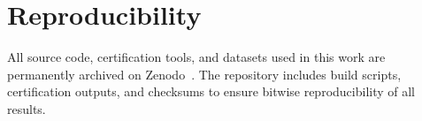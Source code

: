 \documentclass[11pt]{article}
\theoremstyle{inline}
\theoremstyle{break}
\theoremstyle{break}
\theoremstyle{break}
\theoremstyle{break}
\theoremstyle{break}
\theoremstyle{break}
\theoremstyle{break}
\theoremstyle{inline}
\begin{document}
\section{Reproducibility}

All source code, certification tools, and datasets used in this work are permanently archived on Zenodo~\cite{Riemers2025SieveGoldbach}.  
The repository includes build scripts, certification outputs, and checksums to ensure bitwise reproducibility of all results.

\clearpage


\end{document}
